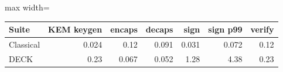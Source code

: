 \begin{adjustbox}{max width=\linewidth}
\begin{tabular}{lrrrrrr}
\toprule
Suite & KEM keygen & encaps & decaps & sign & sign p99 & verify \\
\midrule
Classical & 0.024 & 0.12 & 0.091 & 0.031 & 0.072 & 0.12 \\
DECK & 0.23 & 0.067 & 0.052 & 1.28 & 4.38 & 0.23 \\
\bottomrule
\end{tabular}
\end{adjustbox}
\par{}
